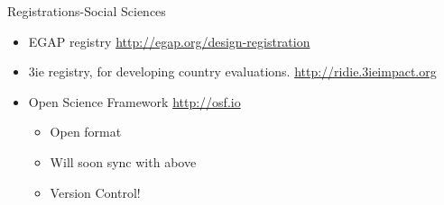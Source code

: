 \documentclass{beamer}
\begin{document}
 { %
    \begin{frame}[plain, label=AEAreg]
     \end{frame}
}

 \begin{frame}{Registrations-Social Sciences}
 \begin{itemize}
   \item
    EGAP registry \url{http://egap.org/design-registration}
   \item 
    3ie registry, for developing country evaluations. \url{http://ridie.3ieimpact.org}
   \item
   	Open Science Framework \url{http://osf.io}
   	\begin{itemize}
   	\item
   	Open format
   	\item
   	Will soon sync with above
   	\item
   	Version Control!
   	\end{itemize}
   \end{itemize}  
\end{frame}
\end{document}
